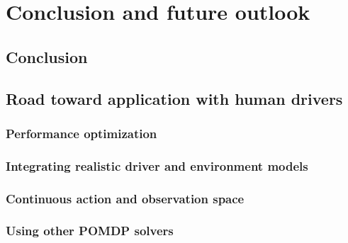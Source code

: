 \chapter{Conclusion and future outlook}
\label{sec:conclusion}

\section{Conclusion}

\section{Road toward application with human drivers}
\subsection{Performance optimization}
\subsection{Integrating realistic driver and environment models}
\subsection{Continuous action and observation space}
\subsection{Using other POMDP solvers}
    
